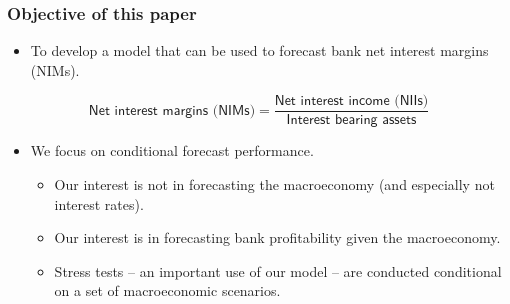 \documentclass[handout]{beamer}
\begin{document}
\begin{frame}
\frametitle{Objective of this paper}
\begin{itemize}
\item \vspace{0.0in} To develop a model that can be used to forecast bank net interest margins (NIMs).
\end{itemize}
\vspace{-0.05in}
\hspace{0.35in}\[\textsf{Net interest margins (NIMs)}=\frac{\textsf{Net interest income (NIIs)}}{\textsf{Interest bearing assets}} \]
\begin{itemize}
\item \vspace{0.05in} We focus on conditional forecast performance.
\begin{itemize}
\item \vspace{0.075in} Our interest is not in forecasting the macroeconomy (and especially not interest rates).
\item \vspace{0.075in} Our interest is in forecasting bank profitability given the macroeconomy.
\item \vspace{0.075in} Stress tests -- an important use of our model --
                       are conducted conditional on a set of macroeconomic scenarios.
\end{itemize}
\end{itemize}
\end{frame}
\end{document}
